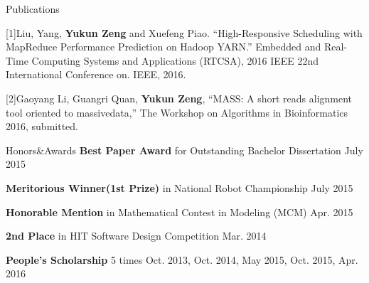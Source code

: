 \documentclass{resume} %
\newcommand{\tab}[1]{\hspace{.2667\textwidth}\rlap{#1}}
\newcommand{\itab}[1]{\hspace{0em}\rlap{#1}}
\begin{document}

\begin{rSection}{Publications}

{[1]Liu, Yang, }{\bf Yukun Zeng}{ and Xuefeng Piao. ``High-Responsive Scheduling with MapReduce Performance Prediction on Hadoop YARN.'' Embedded and Real-Time Computing Systems and Applications (RTCSA), 2016 IEEE 22nd International Conference on. IEEE, 2016.
}
\vspace*{-0.2em}

{[2]Gaoyang Li, Guangri Quan, }{\bf Yukun Zeng}{, ``MASS: A short reads alignment tool oriented to massive}{data,'' The Workshop on Algorithms in Bioinformatics 2016, submitted.}

\end{rSection}


\begin{rSection}{Honors\&Awards}
{\bf Best Paper Award}{ for Outstanding Bachelor Dissertation} \hfill {July 2015}
\vspace*{-0.4em}

{\bf Meritorious Winner(1st Prize)}{ in National Robot Championship} \hfill {July 2015}
\vspace*{-0.4em}

{\bf Honorable Mention}{ in Mathematical Contest in Modeling (MCM)} \hfill {Apr. 2015}
\vspace*{-0.4em}

{\bf 2nd Place}{ in HIT Software Design Competition} \hfill {Mar. 2014} 
\vspace*{-0.4em}

{\bf People's Scholarship} 5 times \hfill {Oct. 2013, Oct. 2014, May 2015, Oct. 2015, Apr. 2016}
\vspace*{-0.4em}

\end{rSection}
\end{document}
